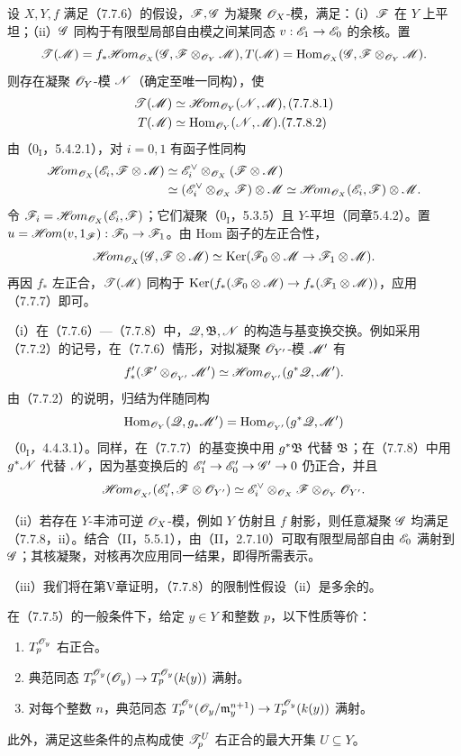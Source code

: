 设 $X,Y,f$ 满足（7.7.6）的假设，$\mathscr F,\mathscr G$ 为凝聚 $\mathscr O_X$-模，满足：（i）$\mathscr F$ 在 $Y$ 上平坦；（ii）$\mathscr G$ 同构于有限型局部自由模之间某同态 $v:\mathscr E_1\to\mathscr E_0$ 的余核。置
\[
 \mathscr T(\mathscr M)=f_*\mathscr{H}\!om_{\mathscr O_X}(\mathscr G,\mathscr F\otimes_{\mathscr O_Y}\mathscr M),
 T(\mathscr M)=\operatorname{Hom}_{\mathscr O_X}(\mathscr G,\mathscr F\otimes_{\mathscr O_Y}\mathscr M).
\]
则存在凝聚 $\mathscr O_Y$-模 $\mathscr N$（确定至唯一同构），使
\begin{align}
 \TT(\M)&\simeq\shHom_{\OO_Y}(\N,\M),\tag{7.7.8.1}\\
 T(\M)&\simeq\Hom_{\OO_Y}(\N,\M).\tag{7.7.8.2}
\end{align}
由（$0_{\mathrm I}$，5.4.2.1），对 $i=0,1$ 有函子性同构
\[
 \begin{aligned}
 \mathscr{H}\!om_{\mathscr O_X}(\mathscr E_i,\mathscr F\otimes\mathscr M)
 &\simeq\mathscr E_i^\vee\otimes_{\mathscr O_X}(\mathscr F\otimes\mathscr M)\\
 &\simeq(\mathscr E_i^\vee\otimes_{\mathscr O_X}\mathscr F)\otimes\mathscr M
 \simeq\mathscr{H}\!om_{\mathscr O_X}(\mathscr E_i,\mathscr F)\otimes\mathscr M.
 \end{aligned}
\]
令 $\mathscr F_i=\mathscr{H}\!om_{\mathscr O_X}(\mathscr E_i,\mathscr F)$；它们凝聚（$0_{\mathrm I}$，5.3.5）且 $Y$-平坦（同章5.4.2）。置 $u=\mathscr{H}\!om(v,1_\mathscr F):\mathscr F_0\to\mathscr F_1$。由 Hom 函子的左正合性，
\[
 \mathscr{H}\!om_{\mathscr O_X}(\mathscr G,\mathscr F\otimes\mathscr M)
 \simeq\operatorname{Ker}(\mathscr F_0\otimes\mathscr M\to\mathscr F_1\otimes\mathscr M).
\]
再因 $f_*$ 左正合，$\mathscr T(\mathscr M)$ 同构于 $\operatorname{Ker}(f_*(\mathscr F_0\otimes\mathscr M)\to f_*(\mathscr F_1\otimes\mathscr M))$，应用（7.7.7）即可。

（i）在（7.7.6）—（7.7.8）中，$\mathscr Q,\mathfrak B,\mathscr N$ 的构造与基变换交换。例如采用（7.7.2）的记号，在（7.7.6）情形，对拟凝聚 $\mathscr O_{Y'}$-模 $\mathscr M'$ 有
\[
 f'_*(\mathscr F'\otimes_{\mathscr O_{Y'}}\mathscr M')
 \simeq\mathscr{H}\!om_{\mathscr O_{Y'}}(g^*\mathscr Q,\mathscr M').
\]
由（7.7.2）的说明，归结为伴随同构
\[
 \operatorname{Hom}_{\mathscr O_Y}(\mathscr Q,g_*\mathscr M')
 =\operatorname{Hom}_{\mathscr O_{Y'}}(g^*\mathscr Q,\mathscr M')
\]
（$0_{\mathrm I}$，4.4.3.1）。同样，在（7.7.7）的基变换中用 $g^*\mathfrak B$ 代替 $\mathfrak B$；在（7.7.8）中用 $g^*\mathscr N$ 代替 $\mathscr N$，因为基变换后的 $\mathscr E'_1\to\mathscr E'_0\to\mathscr G'\to0$ 仍正合，并且
\[
 \mathscr{H}\!om_{\mathscr O_{X'}}(\mathscr E'_i,\mathscr F\otimes\mathscr O_{Y'})
 \simeq\mathscr E_i^\vee\otimes_{\mathscr O_X}\mathscr F\otimes_{\mathscr O_Y}\mathscr O_{Y'}.
\]

（ii）若存在 $Y$-丰沛可逆 $\mathscr O_X$-模，例如 $Y$ 仿射且 $f$ 射影，则任意凝聚 $\mathscr G$ 均满足（7.7.8，ii）。结合（II，5.5.1），由（II，2.7.10）可取有限型局部自由 $\mathscr E_0$ 满射到 $\mathscr G$；其核凝聚，对核再次应用同一结果，即得所需表示。

（iii）我们将在第V章证明，（7.7.8）的限制性假设（ii）是多余的。

在（7.7.5）的一般条件下，给定 $y\in Y$ 和整数 $p$，以下性质等价：
\begin{enumerate}[label=\alph*)]
\item $T_p^{\mathscr O_y}$ 右正合。
\item 典范同态 $T_p^{\mathscr O_y}(\mathscr O_y)\to T_p^{\mathscr O_y}(k(y))$ 满射。
\item 对每个整数 $n$，典范同态 $T_p^{\mathscr O_y}(\mathscr O_y/\mathfrak m_y^{n+1})\to T_p^{\mathscr O_y}(k(y))$ 满射。
\end{enumerate}
此外，满足这些条件的点构成使 $\mathscr T_p^U$ 右正合的最大开集 $U\subseteq Y$。

